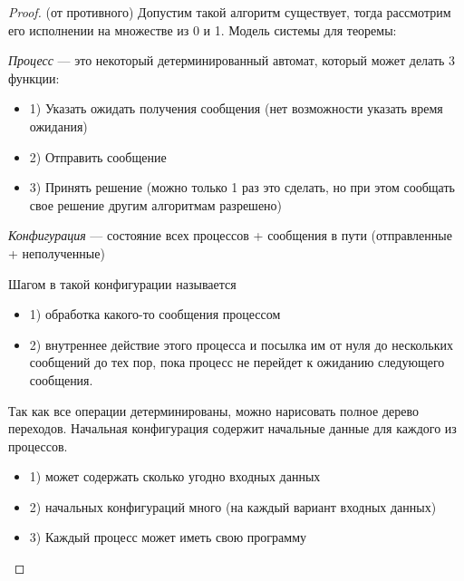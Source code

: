 \begin{proof} (от противного)
    \newline
    Допустим такой алгоритм существует, тогда рассмотрим его исполнении на множестве из 0 и 1.
    \newline
    \newline
    Модель системы для теоремы:
    \begin{definition}
        \textit{Процесс} --- это некоторый детерминированный автомат, который может делать 3 функции:
        \begin{itemize}
        \item 1) Указать ожидать получения сообщения (нет возможности указать время ожидания)
        \item 2) Отправить сообщение
        \item 3) Принять решение (можно только 1 раз это сделать, но при этом сообщать свое решение другим алгоритмам разрешено)
    \end{itemize}
    \end{definition}
    \begin{definition}
        \textit{Конфигурация} --- состояние всех процессов + сообщения в пути (отправленные + неполученные)
    \end{definition}
    \begin{definition}
        Шагом в такой конфигурации называется 
        \begin{itemize}
            \item 1) обработка какого-то сообщения процессом
            \item 2) внутреннее действие этого процесса и посылка им от нуля до нескольких сообщений до тех пор, пока процесс не перейдет к ожиданию следующего сообщения.
        \end{itemize}
    \end{definition}
    Так как все операции детерминированы, можно нарисовать полное дерево переходов.
    \newline
    Начальная конфигурация содержит начальные данные для каждого из процессов.
    \begin{itemize}
        \item 1) может содержать сколько угодно входных данных
        \item 2) начальных конфигураций много (на каждый вариант входных данных)
        \item 3) Каждый процесс может иметь свою программу
    \end{itemize}
    \begin{definition}

\end{definition}
\end{proof}
